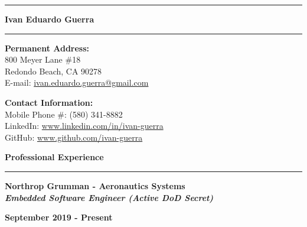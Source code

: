 \documentclass[10pt,letterpaper]{article}
\begin{document}

\hrule
\begin{center}
    \begin{LARGE}
        \textbf{Ivan Eduardo Guerra}
    \end{LARGE}
\end{center}
\hrule

\medskip

\begin{minipage}[t]{0.53\textwidth}
    \begin{flushleft}
        \textbf{Permanent Address:}\\
        800 Meyer Lane \#18\\
        Redondo Beach, CA 90278\\
        E-mail: \href{mailto:ivan.eduardo.guerra@gmail.com}{ivan.eduardo.guerra@gmail.com}
    \end{flushleft}
\end{minipage}
\begin{minipage}[t]{0.44\textwidth}
    \begin{flushright}
        \begin{flushleft}
            \textbf{Contact Information:}\\
            Mobile Phone \#: (580) 341-8882\\
            LinkedIn: \url{www.linkedin.com/in/ivan-guerra}\\
            GitHub: \url{www.github.com/ivan-guerra}
        \end{flushleft}
    \end{flushright}
\end{minipage}

\medskip

\begin{large}
    \textbf{Professional Experience}
\end{large}

\smallskip \hrule \smallskip

\begin{minipage}[t]{0.53\textwidth}
    \begin{flushleft}
        \textbf{Northrop Grumman - Aeronautics Systems}\\
        \textbf{\textit{Embedded Software Engineer (Active DoD Secret)}}\\
    \end{flushleft}
\end{minipage}
\begin{minipage}[t]{0.44\textwidth}
    \begin{flushright}
        \textbf{September 2019 - Present}
    \end{flushright}
\end{minipage}
\end{document}
